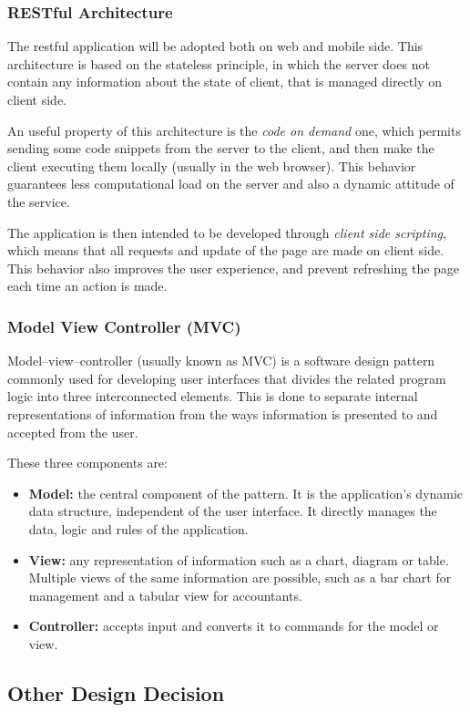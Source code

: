 \documentclass[table, 12pt]{article}
\begin{document}
\subsubsection{RESTful Architecture}
The restful application will be adopted both on web and mobile side. This architecture is based on the stateless principle, in which the server does not contain any information about the state of client, that is managed directly on client side.

An useful property of this architecture is the \textit{code on demand} one, which permits sending some code snippets from the server to the client, and then make the client executing them locally (usually in the web browser). This behavior guarantees less computational load on the server and also a dynamic attitude of the service.

The application is then intended to be developed through \textit{client side scripting}, which means that all requests and update of the page are made on client side. This behavior also improves the user experience, and prevent refreshing the page each time an action is made.

\subsubsection{Model View Controller (MVC)}
Model–view–controller (usually known as MVC) is a software design pattern commonly used for developing user interfaces that divides the related program logic into three interconnected elements. This is done to separate internal representations of information from the ways information is presented to and accepted from the user.

These three components are:
\begin{itemize}
    \item \textbf{Model:} the central component of the pattern. It is the application's dynamic data structure, independent of the user interface. It directly manages the data, logic and rules of the application.
    \item \textbf{View:} any representation of information such as a chart, diagram or table. Multiple views of the same information are possible, such as a bar chart for management and a tabular view for accountants.
    \item \textbf{Controller:} accepts input and converts it to commands for the model or view.
\end{itemize}

\subsection{Other Design Decision}
\end{document}
